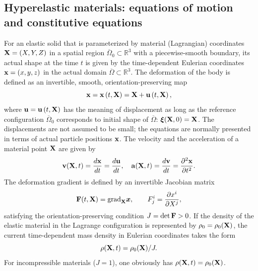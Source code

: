 \documentclass[11pt,letter,subeqn,fleqn]{article}
\numberwithin{equation}{section}
\numberwithin{table}{section}
\numberwithin{figure}{section}
\def\const{\hbox{\rm const}}
\def\vec#1{{\boldsymbol{\rm #1}}} %
\def\vec#1{{\boldsymbol{\rm #1}}} %
\begin{document}
\subsection{Hyperelastic materials: equations of motion and constitutive equations}

For an elastic solid that is parameterized by material (Lagrangian) coordinates $\vec{X}=(X, Y, Z)$ in a spatial region $\overline{\Omega}_{0}\subset \mathbb{R}^{3}$  with a piecewise-smooth boundary, its actual shape at the time $t$ is given by the time-dependent Eulerian coordinates $\vec{x}=(x, y, z)$ in the actual domain $\overline{\Omega}\subset \mathbb{R}^{3}$. The deformation of the body is defined as an invertible, smooth, orientation-preserving map
\begin{equation}\label{eq:Matcoord}
\vec{x}=\vec{x} \left(t,\vec{X}\right)=\vec{X}+\vec{u}\left(t,\vec{X}\right),
\end{equation}
where $\vec{u}=\vec{u}\left(t,\vec{X}\right)$ has the meaning of displacement as long as the reference configuration $\overline{\Omega}_{0}$ corresponds to initial shape of $\overline{\Omega}$: $\vec{\xi}(\vec{X},0)=\vec{X}$. The displacements are not assumed to be small; the equations are normally presented in terms of actual particle positions $\vec{x}$. The velocity and the acceleration of a material point $\vec{X}$ are given by
\[
\vec{v}(\vec{X},t)=\frac{d\vec{x}}{dt}=\frac{d\vec{u}}{dt}, \quad \vec{a}(\vec{X},t)=\frac{d\vec{v}}{dt}=\frac{\partial ^{2}\vec{x}}{\partial t^{2}}.
\]
The deformation gradient is defined by an invertible Jacobian matrix
\begin{equation}{\label{eq:ch15a}}
\vec{F}(t,\vec{X})=\mathrm{grad}_{\vec{X}}\boldsymbol{x}, \qquad F^i_{j} = \frac{\partial x^i}{\partial X^j},
\end{equation}
satisfying the orientation-preserving condition $\displaystyle J=\mathrm{det}\,\vec{F}>0$. If the density of the elastic material in the Lagrange configuration is represented by $\rho_0=\rho_0(\vec{X})$, the current time-dependent mass density in Eulerian coordinates takes the form
\[
\rho(\vec{X},t)=\rho_0(\vec{X})/J.
\]
For incompressible materials ($J=1$), one obviously has $\rho(\vec{X},t)=\rho_0(\vec{X})$.


\end{document}
